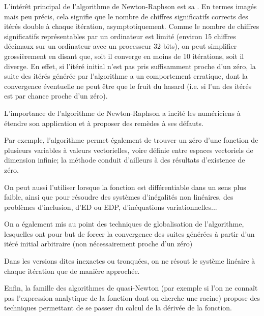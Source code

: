\medskip
L'intérêt principal de l'algorithme de 
Newton-Raphson 
est sa . 
En termes imagés mais peu précis, cela signifie que le nombre de chiffres significatifs corrects des 
itérés double à chaque itération, asymptotiquement. 
Comme le nombre de chiffres significatifs représentables par un ordinateur est limité (environ 15 
chiffres décimaux sur un ordinateur avec un processeur 32-bits), on peut simplifier grossièrement 
en disant que, soit il converge en moins de 10 itérations, soit il diverge. 
En effet, si l'itéré initial n'est pas pris suffisamment proche d'un zéro, la suite des itérés 
générée par l'algorithme a un comportement erratique, dont la convergence éventuelle ne peut 
être que le fruit du hasard (i.e. si l'un des itérés est par chance proche d'un zéro).

\medskip
L'importance de l'algorithme de Newton-Raphson  
a incité les numériciens à étendre son application et à proposer 
des remèdes à ses défauts. 

Par exemple, l'algorithme permet également de trouver un zéro d'une fonction de plusieurs variables 
à valeurs vectorielles, voire définie entre espaces vectoriels de dimension infinie; 
la méthode conduit d'ailleurs à des résultats d'existence de zéro. 

On peut aussi l'utiliser lorsque la fonction est différentiable dans un sens plus faible, ainsi que pour 
résoudre des systèmes d'inégalités non linéaires, des problèmes d'inclusion, d'ED ou EDP,
d'inéquations variationnelles...

On a également mis au point des techniques de globalisation de l'algorithme, lesquelles ont pour but de 
forcer la convergence des suites générées à partir d'un itéré initial arbitraire (non nécessairement 
proche d'un zéro)

Dans les versions dites inexactes ou tronquées, on ne résout le système linéaire à chaque itération 
que de manière approchée. 

Enfin, la famille des algorithmes de quasi-Newton (par exemple si l'on ne connaît pas l'expression
analytique de la fonction dont on cherche une racine) propose des techniques permettant de se passer 
du calcul de la dérivée de la fonction. 

